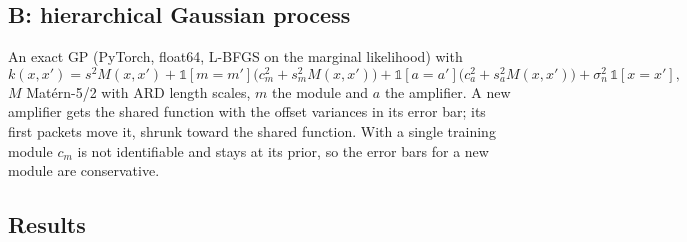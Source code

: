 \documentclass[10pt]{article}
\begin{document}
\subsection{B: hierarchical Gaussian process}
\begin{advanced}
An exact GP (PyTorch, float64, L-BFGS on the marginal likelihood) with
\begin{equation}
k(x,x') = s^2 M(x,x') + \mathbb{1}[m=m']\bigl(c_m^2 + s_m^2 M(x,x')\bigr) + \mathbb{1}[a=a']\bigl(c_a^2 + s_a^2 M(x,x')\bigr) + \sigma_n^2\,\mathbb{1}[x=x'],
\end{equation}
$M$ Matérn-5/2 with ARD length scales, $m$ the module and $a$ the amplifier. A new amplifier gets the shared function with the
offset variances in its error bar; its first packets move it, shrunk toward the shared function. With a single training module $c_m$ is
not identifiable and stays at its prior, so the error bars for a new module are conservative.
\end{advanced}

\subsection{Results}
\end{document}
